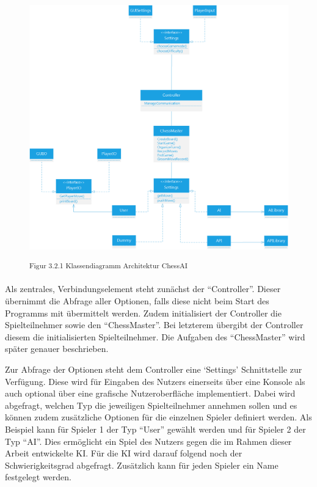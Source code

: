 \begin{figure}[h]
\centering
\includegraphics[width=\textwidth*4/5]{images/architecture_class_diagram.png}

\textsuperscript{Figur 3.2.1 Klassendiagramm Architektur ChessAI}
\end{figure}

Als zentrales, Verbindungselement steht zunächst der ``Controller''. Dieser übernimmt die Abfrage aller Optionen, falls diese nicht beim Start des Programms mit übermittelt werden. Zudem initialisiert der Controller die Spielteilnehmer sowie den ``ChessMaster''. Bei letzterem übergibt der Controller diesem die initialisierten Spielteilnehmer. Die Aufgaben des ``ChessMaster'' wird später genauer beschrieben.

Zur Abfrage der Optionen steht dem Controller eine `Settings' Schnittstelle zur Verfügung. Diese wird für Eingaben des Nutzers einerseits über eine Konsole als auch optional über eine grafische Nutzeroberfläche implementiert. Dabei wird abgefragt, welchen Typ die jeweiligen Spielteilnehmer annehmen sollen und es können zudem zusätzliche Optionen für die einzelnen Spieler definiert werden. Als Beispiel kann für Spieler 1 der Typ ``User'' gewählt werden und für Spieler 2 der Typ ``AI''. Dies ermöglicht ein Spiel des Nutzers gegen die im Rahmen dieser Arbeit entwickelte KI. Für die KI wird darauf folgend noch der Schwierigkeitsgrad abgefragt. Zusätzlich kann für jeden Spieler ein Name festgelegt werden.

